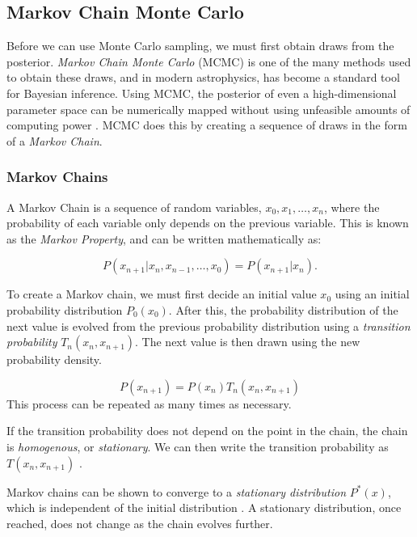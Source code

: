 \documentclass[preprint,longauthor]{aastex631}
\numberwithin{equation}{section}
\begin{document}
\subsection{Markov Chain Monte Carlo}
Before we can use Monte Carlo sampling, we must first obtain draws from the posterior. \textit{Markov Chain Monte Carlo} (MCMC) is one of the many methods used to obtain these draws, and in modern astrophysics, has become a standard tool for Bayesian inference. Using MCMC, the posterior of even a high-dimensional parameter space can be numerically mapped without using unfeasible amounts of computing power \citep{trottaBayesSkyBayesian2008}. MCMC does this by creating a sequence of draws in the form of a \textit{Markov Chain}.

\subsubsection{Markov Chains}

A Markov Chain is a sequence of random variables, $x_0, x_1, \hdots, x_n$, where the probability of each variable only depends on the previous variable. This is known as the \textit{Markov Property}, and can be written mathematically as:

\begin{equation}
  P(x_{n+1}|x_n,x_{n-1},\hdots,x_0) = P(x_{n+1}|x_n).
\end{equation}

To create a Markov chain, we must first decide an initial value $x_0$ using an initial probability distribution $P_0(x_0)$. After this, the probability distribution of the next value is evolved from the previous probability distribution using a \textit{transition probability} $T_n(x_n,x_{n+1})$. The next value is then drawn using the new probability density.

\begin{equation}
  P(x_{n+1}) = P(x_n)T_n(x_n,x_{n+1})
\end{equation}
This process can be repeated as many times as necessary.

If the transition probability does not depend on the point in the chain, the chain is \textit{homogenous}, or \textit{stationary}. We can then write the transition probability as $T(x_n,x_{n+1})$ \citep{neal1993probabilistic}.

Markov chains can be shown to converge to a \textit{stationary distribution} $P^*(x)$, which is independent of the initial distribution \citep{trottaBayesSkyBayesian2008}. A stationary distribution, once reached, does not change as the chain evolves further.
\end{document}
